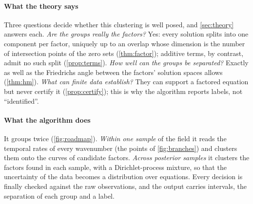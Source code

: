 \paragraph{What the theory says} Three questions decide whether this clustering is well posed, and
\cref{sec:theory} answers each. \emph{Are the groups really the factors?} Yes: every solution splits into one
component per factor, uniquely up to an overlap whose dimension is the number of intersection points of the zero sets
(\cref{thm:factor}); additive terms, by contrast, admit no such split (\cref{prop:terms}). \emph{How well can the
groups be separated?} Exactly as well as the Friedrichs angle between the factors' solution spaces allows
(\cref{thm:hm}). \emph{What can finite data establish?} They can support a factored equation but never certify it
(\cref{prop:certify}); this is why the algorithm reports labels, not ``identified''.

\paragraph{What the algorithm does} It groups twice (\cref{fig:roadmap}). \emph{Within one sample} of the field it
reads the temporal rates of every wavenumber (the points of \cref{fig:branches}) and clusters them onto the curves of
candidate factors. \emph{Across posterior samples} it clusters the factors found in each sample, with a Dirichlet-process
mixture, so that the uncertainty of the data becomes a distribution over equations. Every decision is finally checked
against the raw observations, and the output carries intervals, the separation of each group and a label.

